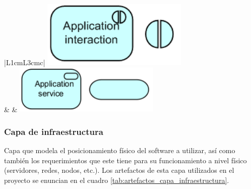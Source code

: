 \begin{table}
\begin{center}
{\begin{tabular}{|L{1cm}L{3cm}c|}
    \includegraphics[width=7cm]{./imagenes/Archimate/applicationinteraction.png}\\
	\hline
	 & 
     &  
    \includegraphics[width=7cm]{./imagenes/Archimate/applicationservice.png}\\
	\hline
  \end{tabular}
  }
    \end{center}
\end{table}

\subsubsection{Capa de infraestructura}

Capa que modela el posicionamiento físico del software a utilizar, así como también los requerimientos que este tiene para su funcionamiento a nivel físico (servidores, redes, nodos, etc.). Los artefactos de esta capa utilizados en el proyecto se enuncian en el cuadro \ref{tab:artefactos_capa_infraestructura}.


